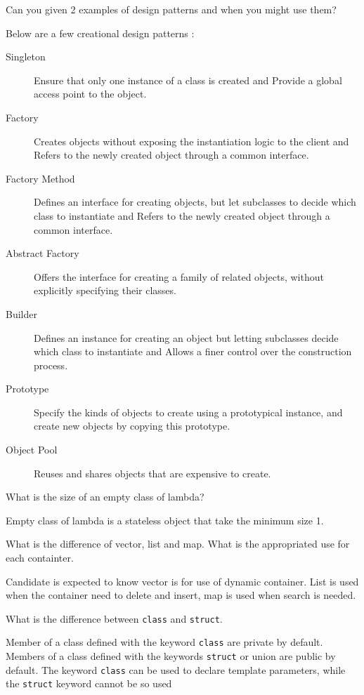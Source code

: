 \documentclass[answers]{exam}
\begin{document}
\begin{questions}
\question Can you given 2 examples of design patterns and when you might use them?
\begin{solution}[.2in]
Below are a few creational design patterns :
\begin{description}
	\item[Singleton] Ensure that only one instance of a class is created and Provide a global access point to the object.
	\item[Factory] Creates objects without exposing the instantiation logic to the client and Refers to the newly created object through a common interface.
	\item[Factory Method] Defines an interface for creating objects, but let subclasses to decide which class to instantiate and Refers to the newly created object through a common interface.
	\item[Abstract Factory] Offers the interface for creating a family of related objects, without explicitly specifying their classes.
	\item[Builder] Defines an instance for creating an object but letting subclasses decide which class to instantiate and Allows a finer control over the construction process.
	\item[Prototype] Specify the kinds of objects to create using a prototypical instance, and create new objects by copying this prototype.
	\item[Object Pool] Reuses and shares objects that are expensive to create.
\end{description}
\end{solution}

\question What is the size of an empty class of lambda?
\begin{solution}[.2in]
Empty class of lambda is a stateless object that take the minimum size 1.
\end{solution}

\question What is the difference of vector, list and map. What is the appropriated use for each containter.
\begin{solution}[.2in]
	Candidate is expected to know vector is for use of dynamic container. List is used when the container need to delete and insert, map is used when search is needed.
\end{solution}

\question What is the difference between \lstinline{class} and \lstinline{struct}.
\begin{solution}[.2in]
	Member of a class defined with the keyword \lstinline{class} are private by default. Members of a class defined with the keywords \lstinline{struct} or union are public by default.
	The keyword \lstinline{class} can be used to declare template parameters, while the \lstinline{struct} keyword cannot be so used
\end{solution}


\end{questions}
\end{document}
